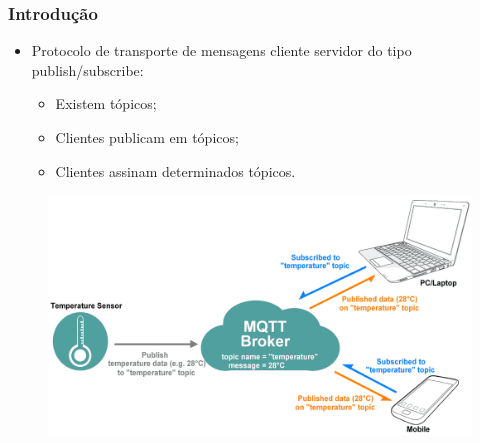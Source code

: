 \documentclass{beamer}
\begin{document}

\begin{frame}
\frametitle{Introdu\c{c}\~ao}

\begin{itemize}
\item Protocolo de transporte de mensagens cliente servidor do tipo publish/subscribe:
	\begin{itemize}
	\item Existem t\'{o}picos;
    \item Clientes publicam em t\'{o}picos;
    \item Clientes assinam determinados t\'{o}picos.
	\end{itemize}

\end{itemize}

\begin{figure}
\centering
\includegraphics[scale=0.2]{MQTT1}
\end{figure}

\end{frame}
\end{document}
